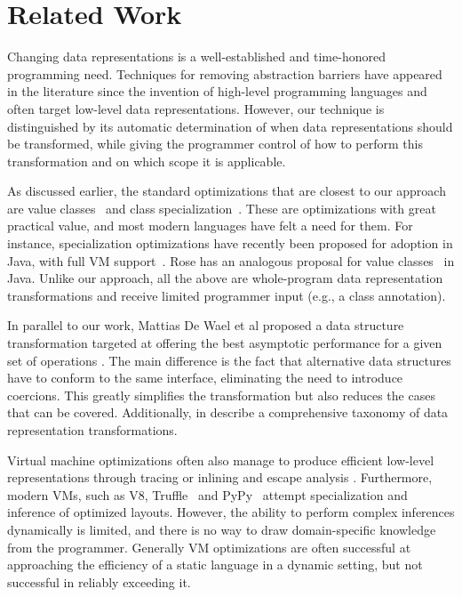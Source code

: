 \section{Related Work}
\label{ildl:sec:related}


Changing data representations is a well-established and time-honored programming need. Techniques for removing abstraction barriers have appeared in the literature since the invention of high-level programming languages and often target low-level data representations. However, our technique is distinguished by its automatic determination of when data representations should be transformed, while giving the programmer control of how to perform this transformation and on which scope it is applicable.

As discussed earlier, the standard optimizations that are closest to our approach are value classes~\cite{sip-value-classes} and class specialization~\cite{iuli-thesis,miniboxing}. These are optimizations with great practical value, and most modern languages have felt a need for them. For instance, specialization optimizations have recently been proposed for adoption in Java, with full VM support~\cite{goetz-specialization}. Rose has an analogous proposal for value classes~\cite{rose-value-classes-vm,rose-value-classes-tearing} in Java. Unlike our approach, all the above are whole-program data representation transformations and receive limited programmer input (e.g., a class annotation).

In parallel to our work, Mattias De Wael et al proposed a data structure transformation targeted at offering the best asymptotic performance for a given set of operations \cite{de-wael-onward,de-wael-icooolps}. The main difference is the fact that alternative data structures have to conform to the same interface, eliminating the need to introduce coercions. This greatly simplifies the transformation but also reduces the cases that can be covered. Additionally, in \cite{de-wael-onward} describe a comprehensive taxonomy of data representation transformations.

Virtual machine optimizations often also manage to produce efficient low-level representations through tracing \cite{tracemonkey} or inlining and escape analysis \cite{escape-analysis-first-paper,stadler-escape-analysis}. Furthermore, modern VMs, such as V8, Truffle~\cite{graal} and PyPy~\cite{bolz-pypy-tracing-jit} attempt specialization and inference of optimized layouts. However, the ability to perform complex inferences dynamically is limited, and there is no way to draw domain-specific knowledge from the programmer. Generally VM optimizations are often successful at approaching the efficiency of a static language in a dynamic setting, but not successful in reliably exceeding it.

